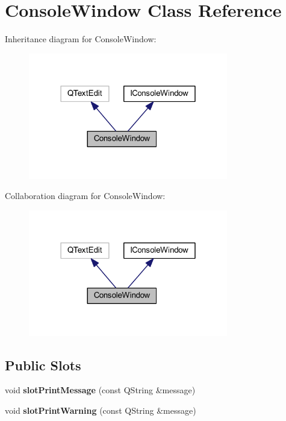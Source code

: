 \hypertarget{class_console_window}{\section{Console\-Window Class Reference}
\label{class_console_window}
}


Inheritance diagram for Console\-Window\-:
\nopagebreak
\begin{figure}[H]
\begin{center}
\leavevmode
\includegraphics[width=247pt]{class_console_window__inherit__graph}
\end{center}
\end{figure}


Collaboration diagram for Console\-Window\-:
\nopagebreak
\begin{figure}[H]
\begin{center}
\leavevmode
\includegraphics[width=247pt]{class_console_window__coll__graph}
\end{center}
\end{figure}
\subsection*{Public Slots}
\begin{DoxyCompactItemize}
\item 
\hypertarget{class_console_window_ae9c69bfdddc7e06686ce1aef07228a5f}{void {\bfseries slot\-Print\-Message} (const Q\-String \&message)}\label{class_console_window_ae9c69bfdddc7e06686ce1aef07228a5f}

\item 
\hypertarget{class_console_window_a2a2390460eb7eae4ba129f3e649fa03e}{void {\bfseries slot\-Print\-Warning} (const Q\-String \&message)}\label{class_console_window_a2a2390460eb7eae4ba129f3e649fa03e}

\end{DoxyCompactItemize}

